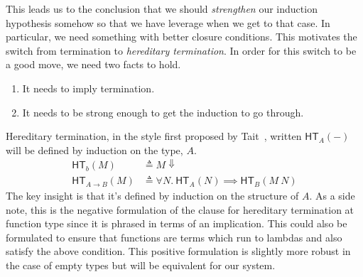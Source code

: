 \documentclass{article}
\newcommand{\hterm}[2]{\ensuremath{\mathsf{HT}_{#1}(#2)}}
\newcommand{\fn}[2]{\ensuremath{#1 \to #2}}
\newcommand{\ap}[2]{\ensuremath{#1\ #2}}
\begin{document}
This leads us to the conclusion that we should \emph{strengthen} our
induction hypothesis somehow so that we have leverage when we get to
that case. In particular, we need something with better closure
conditions. This motivates the switch from termination to
\emph{hereditary termination}. In order for this switch to be a good
move, we need two facts to hold.
\begin{enumerate}
\item It needs to imply termination.
\item It needs to be strong enough to get the induction to go through.
\end{enumerate}
Hereditary termination, in the style first proposed by
Tait~\citep{Tait:67}, written $\hterm{A}{-}$ will be defined by
induction on the type, $A$.
\begin{align*}
  \hterm{b}{M} &\triangleq M \Downarrow\\
  \hterm{\fn{A}{B}}{M} &\triangleq
  \forall N.\ \hterm{A}{N} \implies \hterm{B}{\ap{M}{N}}
\end{align*}
The key insight is that it's defined by induction on the structure of
$A$. As a side note, this is the negative formulation of the clause
for hereditary termination at function type since it is phrased in terms of an implication. This could also be
formulated to ensure that functions are terms which run to lambdas and
also satisfy the above condition. This positive formulation is
slightly more robust in the case of empty types but will be equivalent
for our system.
\end{document}
